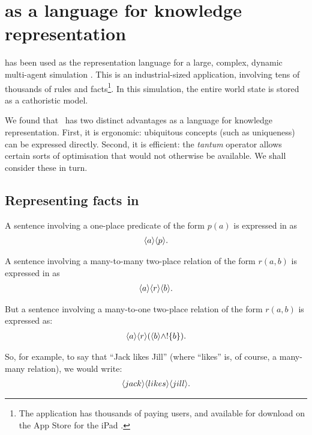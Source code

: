 \section{\Cathoristic{} as a language for knowledge representation}\label{kr}


\Cathoristic{} has been used as the representation language for a
large, complex, dynamic multi-agent simulation \cite{evans-and-short}.
This is an industrial-sized application, involving tens of thousands
of rules and facts\footnote{The application has thousands of paying
  users, and available for download on the App Store for the iPad
  \cite{Versu}.}.  In this simulation, the entire world state is stored
as a cathoristic model.
	
We found that \cathoristic\ has two distinct advantages as a language for knowledge representation. First, it is ergonomic: ubiquitous concepts (such as uniqueness) can be expressed directly.
Second, it is efficient: the \emph{tantum} operator allows certain sorts of optimisation that would not otherwise be available.
We shall consider these in turn.

\subsection{Representing facts  in \cathoristic{}}

A sentence involving a one-place predicate of the form $p(a)$ is
expressed in \cathoristic{} as
\begin{eqnarray*}
   \langle a \rangle \langle p \rangle .
\end{eqnarray*}

\NI A sentence involving a many-to-many two-place relation of the form
$r(a,b)$ is expressed in \cathoristic{} as
\begin{eqnarray*}
  \langle a \rangle \langle r \rangle \langle b \rangle .
\end{eqnarray*}

\NI But a sentence involving a many-to-one two-place relation of the
form $r(a,b)$ is expressed as:
\begin{eqnarray*}
  \langle a \rangle \langle r \rangle (\langle b \rangle \land ! \{b\}).
\end{eqnarray*}


\NI So, for example, to say that ``Jack likes Jill'' (where ``likes'' is,
of course, a many-many relation), we would write:
\begin{eqnarray*}
  \langle jack \rangle \langle likes \rangle \langle jill \rangle .
\end{eqnarray*}


